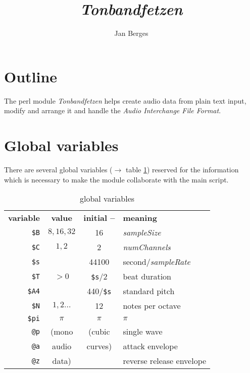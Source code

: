 \documentclass[a4paper, 10pt]{article}
\title{\itshape \ttfamily Tonbandfetzen}
\author{Jan Berges}
\begin{document}
	\maketitle
	
	\section*{Outline}
	
	The perl module {\it Tonbandfetzen} helps create audio data from plain text input, modify and arrange it and handle the {\it Audio Interchange File Format}.
	
	\section*{Global variables}
	
	There are several global variables ($\rightarrow$ table \ref{variables}) reserved for the information which is necessary to make the module collaborate with the main script.
	\begin{table}[H]
		\centering
		\begin{tabular}
		    { r            c              c                  l }
			{\bf variable} & {\bf value}  & {\bf initial --} & {\bf meaning}            \\
			\verb|$B|      & $8, 16, 32$  & 16               & {\it sampleSize}         \\
			\verb|$C|      & $1, 2$       & 2                & {\it numChannels}        \\
			\verb|$s|      &              & 44100            & second/{\it sampleRate}  \\
			\verb|$T|      & $> 0$        & \verb|$s|/2      & beat duration            \\
			\verb|$A4|     &              & 440/\verb|$s|    & standard pitch           \\
			\verb|$N|      & $1, 2\hdots$ & 12               & notes per octave         \\
			\verb|$pi|     & $\pi$        & $\pi$            & $\pi$                    \\
			\verb|@p|      & (mono        & (cubic           & single wave              \\
			\verb|@a|      & audio        & curves)          & attack envelope          \\
			\verb|@z|      & data)        &                  & reverse release envelope \\
		\end{tabular}
		\caption{global variables}
		\label{variables}
	\end{table}
	
\end{document}
